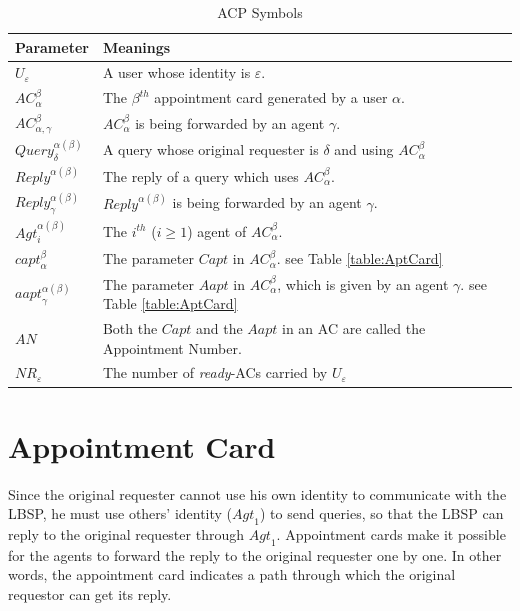 \documentclass[conference]{IEEEtran}
\begin{document}
\begin{table} [hbtp]
\caption{ACP Symbols}
\label{table:ACPSymbols}
\centering
\tabulinesep=1mm
\begin{tabu} to 80mm{|X[1,c]|X[4,l]|} \hline 
Parameter & Meanings \\ \hline 
${U}_{\varepsilon}$ & A user whose identity is $\varepsilon$. \\ \hline 
${AC}_{\alpha}^{\beta}$ & The $\beta^{th}$ appointment card generated by a user $\alpha$. \\ \hline 
${AC}_{{\alpha},{\gamma}}^{\beta}$ & ${AC}_{\alpha}^{\beta}$ is being forwarded by an agent $\gamma$. \\ \hline 
${Query}_{\delta}^{{\alpha}\left({\beta}\right)}$ & A query whose original requester is $\delta$ and using ${AC}_{\alpha}^{\beta}$ \\ \hline 
${{Reply}}^{{\alpha}\left({\beta}\right)}$ & The reply of a query which uses ${AC}_{\alpha}^{\beta}$. \\ \hline 
${{Reply}}_{\gamma}^{{\alpha}\left({\beta}\right)}$ & ${Reply}^{\alpha\left(\beta\right)}$ is being forwarded by an agent $\gamma$. \\ \hline 
${{Agt}}_{i}^{{\alpha}\left({\beta}\right)}$ & The $i^{th}$ ($i\geq1$) agent of ${AC}_{\alpha}^{\beta}$. \\ \hline 
${{capt}}_{\alpha}^{\beta}$ & The parameter $Capt$ in ${AC}_\alpha^\beta$. see Table \ref{table:AptCard} \\ \hline 
${{aapt}}_{\gamma}^{{\alpha}\left({\beta}\right)}$ & The parameter $Aapt$ in ${AC}_{\alpha}^{\beta}$, which is given by an agent $\gamma$. see Table \ref{table:AptCard} \\ \hline 
$AN$ & Both the $Capt$ and the $Aapt$ in an AC are called the Appointment Number. \\ \hline 
${NR}_{\varepsilon}$ & The number of \textit{ready}-ACs carried by ${U}_{\varepsilon}$ \\ \hline 
\end{tabu}
\end{table}

\section{ Appointment Card}

\noindent Since the original requester cannot use his own identity to communicate with the LBSP, he must use others' identity (${Agt}_1$) to send queries, so that the LBSP can reply to the original requester through ${Agt}_1$. Appointment cards make it possible for the agents to forward the reply to the original requester one by one. In other words, the appointment card indicates a path through which the original requestor can get its reply. 
\end{document}
